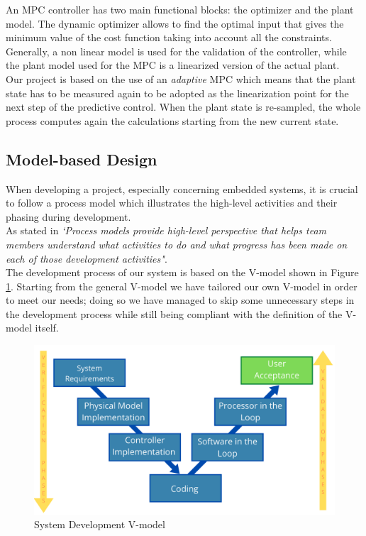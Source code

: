 An MPC controller has two main functional blocks: the optimizer and the plant model.
The dynamic optimizer allows to find the optimal input that gives the minimum
value of the cost function taking into account all the constraints. Generally, a non linear model is used for the validation of the controller, while the plant model used for the MPC is a linearized version of the actual plant.\\
Our project is based on the use of an \emph{adaptive} MPC which means that the plant state has to be measured again to be adopted as the linearization point for the next step of the predictive control. When the plant state is re-sampled, the whole process
computes again the calculations starting from the new current state.

\subsection{Model-based Design}
When developing a project, especially concerning embedded systems, it is crucial to follow a process model which illustrates the high-level activities and their phasing during development.\\
As stated in \cite{FOWLER20151} \emph{`Process models provide high-level perspective that helps team members understand what activities to do and what progress  has been made on each of those development activities"}.\\
The development process of our system is based on the V-model shown in Figure \ref{fig:V_model}.
Starting from the general V-model we have tailored our own V-model in order to meet our needs; doing so we have managed to skip some unnecessary steps in the development process while still being compliant with the definition of the V-model itself.

\begin{figure}[H]
    \centering
    \includegraphics[width=1\textwidth]{Figures/V-MODEL.png}
    \caption{System Development V-model}
    
    \label{fig:V_model}
\end{figure}

